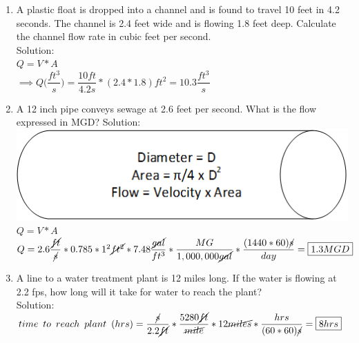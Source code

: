 \documentclass{article}
\begin{document}
\begin{enumerate}
\item A plastic float is dropped into a channel and is found to travel 10 feet in 4.2 seconds. The channel is 2.4 feet wide and is flowing 1.8 feet deep. Calculate the channel flow rate in cubic feet per second.\\
Solution:\\
$Q=V*A$\\
\vspace{0.3cm}
$\implies Q\Big(\dfrac{ft^3}{s}\Big)=\dfrac{10ft}{4.2s}*(2.4*1.8)ft^2=\boxed{10.3\dfrac{ft^3}{s}}$
\item A 12 inch pipe conveys sewage at 2.6 feet per second.  What is the flow expressed in MGD?
Solution:\\
\vspace{0.3cm}
\includegraphics[scale=0.5]{PipeFlow}\\
\vspace{0.3cm}
$Q=V*A$\\
\vspace{0.3cm}
$Q=2.6\dfrac{\cancel{ft}}{\cancel{s}}*0.785*1^2\cancel{ft^2}*7.48\dfrac{\cancel{gal}}{ft^3}*\dfrac{MG}{1,000,000\cancel{gal}}*\dfrac{(1440*60)\cancel{s}}{day}=\boxed{1.3MGD}$\\

\item A line to a water treatment plant is 12 miles long. If the water is flowing at 2.2 fps, how long will it take for water to reach the plant?\\
Solution:\\
$time \enspace to \enspace reach \enspace plant \enspace (hrs)=\dfrac{\cancel{s}}{2.2\cancel{ft}}*\dfrac{5280\cancel{ft}}{\cancel{mile}}*12\cancel{miles}*\dfrac{hrs}{(60*60)\cancel{s}}=\boxed{8hrs}$  




\end{enumerate}
\end{document}
